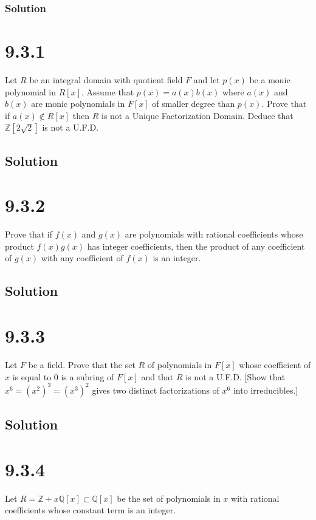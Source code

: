 \documentclass[fleqn]{article}
\begin{document}
            \subsubsection{Solution}
            
    
    \section{9.3.1}
    Let $R$ be an integral domain with quotient field $F$ and let $p(x)$ be a monic polynomial in $R[x]$.  Assume that $p(x) = a(x)b(x)$ where $a(x)$ and $b(x)$ are monic polynomials in $F[x]$ of smaller degree than $p(x)$.  Prove that if $a(x) \notin R[x]$ then $R$ is not a Unique Factorization Domain.  Deduce that $\mathbb{Z}\left[2\sqrt{2}\right]$ is not a U.F.D.
        
        \subsection{Solution}
        
    
    \section{9.3.2}
    Prove that if $f(x)$ and $g(x)$ are polynomials with rational coefficients whose product $f(x)g(x)$ has integer coefficients, then the product of any coefficient of $g(x)$ with any coefficient of $f(x)$ is an integer.
        
        \subsection{Solution}
        
    
    \section{9.3.3}
    Let $F$ be a field.  Prove that the set $R$ of polynomials in $F[x]$ whose coefficient of $x$ is equal to 0 is a subring of $F[x]$ and that $R$ is not a U.F.D.  [Show that $x^6 = (x^2)^3 = (x^3)^2$ gives two distinct factorizations of $x^6$ into irreducibles.]
        
        \subsection{Solution}
        
    
    \section{9.3.4}
    Let $R = \mathbb{Z} + x \mathbb{Q}[x] \subset \mathbb{Q}[x]$ be the set of polynomials in $x$ with rational coefficients whose constant term is an integer.
        
\end{document}
